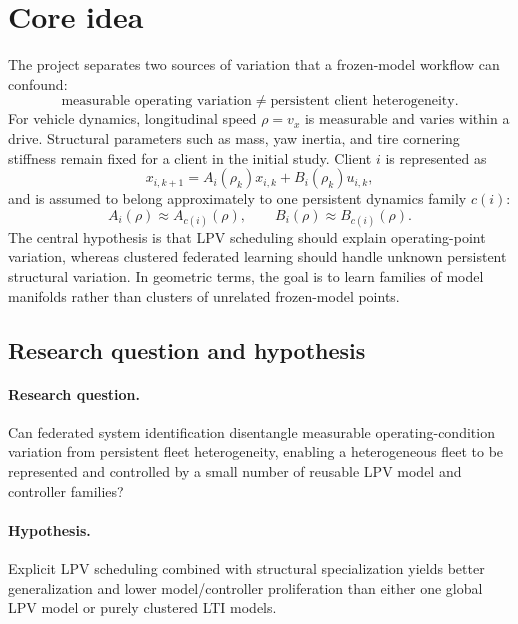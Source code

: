 \section{Core idea}
The project separates two sources of variation that a frozen-model workflow can
confound:
\begin{equation}
  \text{measurable operating variation} \neq
  \text{persistent client heterogeneity}.
\end{equation}
For vehicle dynamics, longitudinal speed $\rho=v_x$ is measurable and varies
within a drive. Structural parameters such as mass, yaw inertia, and tire
cornering stiffness remain fixed for a client in the initial study. Client $i$ is
represented as
\begin{equation}
  x_{i,k+1}=A_i(\rho_k)x_{i,k}+B_i(\rho_k)u_{i,k},
\end{equation}
and is assumed to belong approximately to one persistent dynamics family $c(i)$:
\begin{equation}
  A_i(\rho)\approx A_{c(i)}(\rho),\qquad
  B_i(\rho)\approx B_{c(i)}(\rho).
\end{equation}
The central hypothesis is that LPV scheduling should explain operating-point
variation, whereas clustered federated learning should handle unknown persistent
structural variation. In geometric terms, the goal is to learn families of model
manifolds rather than clusters of unrelated frozen-model points.

\subsection{Research question and hypothesis}
\paragraph{Research question.}
Can federated system identification disentangle measurable operating-condition
variation from persistent fleet heterogeneity, enabling a heterogeneous fleet to
be represented and controlled by a small number of reusable LPV model and
controller families?

\paragraph{Hypothesis.}
Explicit LPV scheduling combined with structural specialization yields better
generalization and lower model/controller proliferation than either one global
LPV model or purely clustered LTI models.


